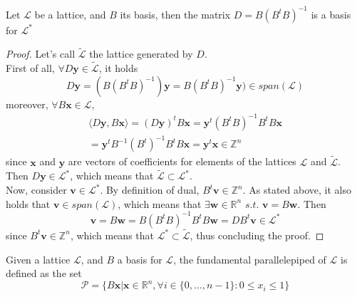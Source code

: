 \begin{theorem}
Let $\mathscr{L}$ be a lattice, and $B$ its basis, then the matrix $D=B(B^{t}B)^{-1}$ is a basis for $\mathscr{L}^*$
\end{theorem}
\begin{proof}
Let's call $\tilde{\mathscr{L}}$ the lattice generated by $D$.\\
First of all, $\forall{D\mathbf{y}} \in \tilde{\mathscr{L}}$, it holds
\begin{equation*}
D\mathbf{y} = (B(B^{t}B)^{-1})\mathbf{y} = B(B^{t}B)^{-1}\mathbf{y}) \in span(\mathscr{L})
\end{equation*}
moreover, $\forall B\mathbf{x}\in\mathscr{L}$,
\begin{equation*}
\begin{aligned}
\langle D\mathbf{y},B\mathbf{x} \rangle = (D\mathbf{y})^{t}B\mathbf{x} = \mathbf{y}^{t} (B^tB)^{-1}B^tB\mathbf{x}\\
= \mathbf{y}^{t} B^{-1}(B^t)^{-1}B^tB\mathbf{x} = \mathbf{y}^t\mathbf{x} \in \mathbb{Z}^n
\end{aligned}
\end{equation*}
since $\mathbf{x}$ and $\mathbf{y}$ are vectors of coefficients for elements of the lattices $\mathscr{L}$ and $\tilde{\mathscr{L}}$. Then $D\mathbf{y}\in\mathscr{L}^*$, which means that $\tilde{\mathscr{L}}\subset\mathscr{L}^*$.\\
Now, consider $\mathbf{v}\in\mathscr{L}^*$. By definition of dual, $B^t\mathbf{v}\in\mathbb{Z}^n$. As stated above, it also holds that $\mathbf{v}\in span(\mathscr{L})$, which means that $\exists\mathbf{w}\in\mathbb{R}^n$ $s.t.$ $\mathbf{v}=B\mathbf{w}$. Then
\begin{equation*}
\mathbf{v} = B\mathbf{w} = B(B^tB)^{-1}B^tB\mathbf{w} = DB^t\mathbf{v} \in \mathscr{L}^*
\end{equation*}
since $B^t\mathbf{v}\in\mathbb{Z}^n$, which means that $\mathscr{L}^*\subset\tilde{\mathscr{L}}$, thus concluding the proof.
\end{proof}

\begin{definition}
Given a lattice $\mathscr{L}$, and $B$ a basis for $\mathscr{L}$, the fundamental parallelepiped of $\mathscr{L}$ is defined as the set
\begin{equation*}
\mathscr{P} = \{B\mathbf{x}|\mathbf{x}\in\mathbb{R}^n, \forall i \in \{0,\ldots,n-1\}:0\leq x_i \leq 1 \}
\end{equation*}
\end{definition}

